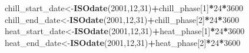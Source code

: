 \documentclass[
]{book}
\newenvironment{Shaded}{\begin{snugshade}}{\end{snugshade}}
\newcommand{\DecValTok}[1]{\textcolor[rgb]{0.00,0.00,0.81}{#1}}
\newcommand{\KeywordTok}[1]{\textcolor[rgb]{0.13,0.29,0.53}{\textbf{#1}}}
\newcommand{\NormalTok}[1]{#1}
\newcommand{\OperatorTok}[1]{\textcolor[rgb]{0.81,0.36,0.00}{\textbf{#1}}}
\begin{document}
\begin{Shaded}
\begin{Highlighting}[]
\NormalTok{  chill_start_date<-}\KeywordTok{ISOdate}\NormalTok{(}\DecValTok{2001}\NormalTok{,}\DecValTok{12}\NormalTok{,}\DecValTok{31}\NormalTok{)}\OperatorTok{+}\NormalTok{chill_phase[}\DecValTok{1}\NormalTok{]}\OperatorTok{*}\DecValTok{24}\OperatorTok{*}\DecValTok{3600}
\NormalTok{  chill_end_date<-}\KeywordTok{ISOdate}\NormalTok{(}\DecValTok{2001}\NormalTok{,}\DecValTok{12}\NormalTok{,}\DecValTok{31}\NormalTok{)}\OperatorTok{+}\NormalTok{chill_phase[}\DecValTok{2}\NormalTok{]}\OperatorTok{*}\DecValTok{24}\OperatorTok{*}\DecValTok{3600}
\NormalTok{  heat_start_date<-}\KeywordTok{ISOdate}\NormalTok{(}\DecValTok{2001}\NormalTok{,}\DecValTok{12}\NormalTok{,}\DecValTok{31}\NormalTok{)}\OperatorTok{+}\NormalTok{heat_phase[}\DecValTok{1}\NormalTok{]}\OperatorTok{*}\DecValTok{24}\OperatorTok{*}\DecValTok{3600}
\NormalTok{  heat_end_date<-}\KeywordTok{ISOdate}\NormalTok{(}\DecValTok{2001}\NormalTok{,}\DecValTok{12}\NormalTok{,}\DecValTok{31}\NormalTok{)}\OperatorTok{+}\NormalTok{heat_phase[}\DecValTok{2}\NormalTok{]}\OperatorTok{*}\DecValTok{24}\OperatorTok{*}\DecValTok{3600}


\end{Highlighting}
\end{Shaded}
\end{document}

